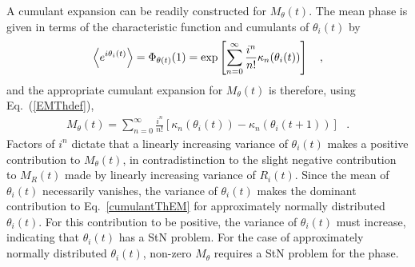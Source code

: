A cumulant expansion can be readily constructed for $M_\theta(t)$. 
The mean  phase is given in terms of the characteristic function and cumulants of $\theta_i(t)$ by
%
\begin{equation}
  \begin{split}
    \left< e^{i\theta_i(t)} \right> = \Phi_{\theta(t)}(1) = \exp\left[\sum_{n=0}^\infty \frac{i^n}{n!}\kappa_n(\theta_i(t))\right]
    \ \ \ ,
  \end{split}
  \label{cumulantTh}
\end{equation}
%
and  the appropriate cumulant expansion for $M_\theta(t)$ is therefore, 
using Eq.~(\ref{EMThdef}),
%
\begin{equation}
  \begin{split}
    M_\theta(t) = \sum_{n=0}^\infty \frac{i^n}{n!}\left[ \kappa_n(\theta_i(t)) - \kappa_n(\theta_i(t+1)) \right]
    \ \ \  .
  \end{split}
  \label{cumulantThEM}
\end{equation}
%
Factors of $i^n$ dictate that a linearly increasing variance of $\theta_i(t)$ makes a positive contribution to $M_\theta(t)$, 
in contradistinction to the slight negative contribution to $M_R(t)$ made by linearly increasing variance of $R_i(t)$. 
Since the mean of $\theta_i(t)$ necessarily vanishes, the variance of $\theta_i(t)$ makes the dominant contribution 
to Eq.~\eqref{cumulantThEM} for approximately normally distributed $\theta_i(t)$. 
For this contribution to be positive, the variance of $\theta_i(t)$ must increase, indicating that  
$\theta_i(t)$ has a StN problem. 
For the case of approximately normally distributed  $\theta_i(t)$, non-zero $M_\theta$  requires a StN problem for the  phase.





